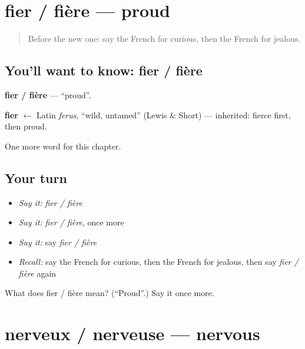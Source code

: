 \section[fier / fière]{fier / fière — proud}

\label{lesson:FR-C218-fier-fiere}



\begin{quote}
Before the new one: say the French for curious, then the French for jealous.
\end{quote}

\subsection*{You'll want to know: fier / fière}
\textbf{fier / fière} — \textquotedblleft{}proud\textquotedblright{}.

\begin{cousinweb}
\textbf{fier} $\leftarrow$ Latin \emph{ferus}, \textquotedblleft{}wild, untamed\textquotedblright{} (Lewis \& Short) — inherited: fierce first, then proud.
\end{cousinweb}

\begin{grammarlens}[title={What you've built}]
One more word for this chapter.
\end{grammarlens}

\subsection*{Your turn}
\begin{itemize}
\raggedright
  \item \emph{Say it:} \emph{fier / fière}
  \item \emph{Say it:} \emph{fier / fière}, once more
  \item \emph{Say it:} say \emph{fier / fière}
  \item \emph{Recall:} say the French for curious, then the French for jealous, then say \emph{fier / fière} again
\end{itemize}

\begin{tcolorbox}[breakable,colback=teal!4,colframe=teal!35!black,title={Before you move on}]
What does fier / fière mean? (\textquotedblleft{}Proud\textquotedblright{}.) Say it once more.
\end{tcolorbox}
\section[nerveux / nerveuse]{nerveux / nerveuse — nervous}

